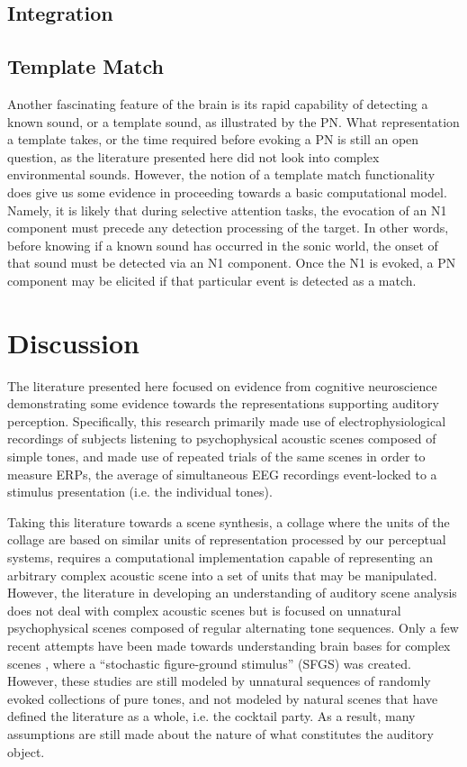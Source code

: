 \documentclass[a4paper,10pt,final]{ThesisStyle}
\begin{document}
\subsection{Integration}

\subsection{Template Match}

Another fascinating feature of the brain is its rapid capability of detecting a known sound, or a template sound, as illustrated by the PN.  What representation a template takes, or the time required before evoking a PN is still an open question, as the literature presented here did not look into complex environmental sounds.  However, the notion of a template match functionality does give us some evidence in proceeding towards a basic computational model.  Namely, it is likely that during selective attention tasks, the evocation of an N1 component must precede any detection processing of the target.  In other words, before knowing if a known sound has occurred in the sonic world, the onset of that sound must be detected via an N1 component.  Once the N1 is evoked, a PN component may be elicited if that particular event is detected as a match. 


\section{Discussion}

The literature presented here focused on evidence from cognitive neuroscience demonstrating some evidence towards the representations supporting auditory perception.  Specifically, this research primarily made use of electrophysiological recordings of subjects listening to psychophysical acoustic scenes composed of simple tones, and made use of repeated trials of the same scenes in order to measure ERPs, the average of simultaneous EEG recordings event-locked to a stimulus presentation (i.e. the individual tones).  

Taking this literature towards a scene synthesis, a collage where the units of the collage are based on similar units of representation processed by our perceptual systems, requires a computational implementation capable of representing an arbitrary complex acoustic scene into a set of units that may be manipulated.  However, the literature in developing an understanding of auditory scene analysis does not deal with complex acoustic scenes but is focused on unnatural psychophysical scenes composed of regular alternating tone sequences.  Only a few recent attempts have been made towards understanding brain bases for complex scenes \cite{Teki2011a,Teki2013}, where a ``stochastic figure-ground stimulus'' (SFGS) was created.  However, these studies are still modeled by unnatural sequences of randomly evoked collections of pure tones, and not modeled by natural scenes that have defined the literature as a whole, i.e. the cocktail party.  As a result, many assumptions are still made about the nature of what constitutes the auditory object.  
\end{document}
